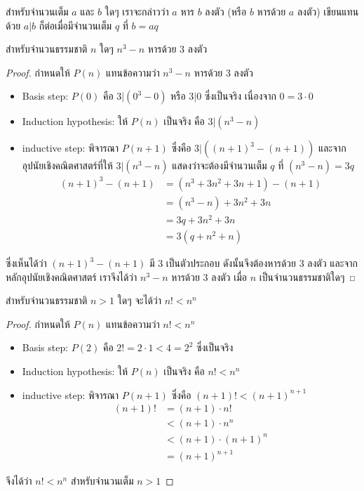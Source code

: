 \begin{definition}
สำหรับจำนวนเต็ม $a$ และ $b$ ใดๆ เราจะกล่าวว่า $a$ หาร $b$ ลงตัว (หรือ $b$ หารด้วย $a$ ลงตัว) เขียนแทนด้วย $a|b$ ก็ต่อเมื่อมีจำนวนเต็ม $q$ ที่ $b=aq$
\end{definition}
\begin{theorem}
สำหรับจำนวนธรรมชาติ $n$ ใดๆ $n^3-n$ หารด้วย 3 ลงตัว
\end{theorem}
\begin{proof}
กำหนดให้ $P(n)$ แทนข้อความว่า $n^3-n$ หารด้วย 3 ลงตัว
\begin{itemize}
\item Basis step: $P(0)$ คือ $3|(0^3-0)$ หรือ $3|0$ ซึ่งเป็นจริง เนื่องจาก $0=3 \cdot 0$
\item Induction hypothesis: ให้ $P(n)$ เป็นจริง คือ $3|(n^3-n)$
\item inductive step: พิจารณา $P(n+1)$ ซึ่งคือ $3|((n+1)^3-(n+1))$ และจากอุปนัยเชิงคณิตศาสตร์ที่ให้ $3|(n^3-n)$ แสดงว่าจะต้องมีจำนวนเต็ม $q$ ที่ $(n^3-n)=3q$
\begin{align*}
(n+1)^3-(n+1) &= (n^3+3n^2+3n+1)-(n+1) \\
&= (n^3-n)+3n^2+3n \\
&= 3q+3n^2+3n \\
&= 3(q+n^2+n)
\end{align*}
\end{itemize}
ซึ่งเห็นได้ว่า $(n+1)^3-(n+1)$ มี 3 เป็นตัวประกอบ ดังนั้นจึงต้องหารด้วย 3 ลงตัว และจากหลักอุปนัยเชิงคณิตศาสตร์ เราจึงได้ว่า $n^3-n$ หารด้วย 3 ลงตัว เมื่อ $n$ เป็นจำนวนธรรมชาติใดๆ
\end{proof}

\begin{theorem}
สำหรับจำนวนธรรมชาติ $n > 1$ ใดๆ จะได้ว่า $n! < n^n$
\end{theorem}
\begin{proof}
กำหนดให้ $P(n)$ แทนข้อความว่า $n! < n^n$
\begin{itemize}
\item Basis step: $P(2)$ คือ $2!=2 \cdot 1 < 4 = 2^2$ ซึ่งเป็นจริง
\item Induction hypothesis: ให้ $P(n)$ เป็นจริง คือ $n! < n^n$
\item inductive step: พิจารณา $P(n+1)$ ซึ่งคือ $(n+1)! < (n+1)^{n+1}$
\begin{align*}
(n+1)! &= (n+1) \cdot n! \\
&< (n+1) \cdot n^n \\
&< (n+1) \cdot (n+1)^n \\
&= (n+1)^{n+1}
\end{align*}
\end{itemize}
จึงได้ว่า $n! < n^n$ สำหรับจำนวนเต็ม $n > 1$
\end{proof}

